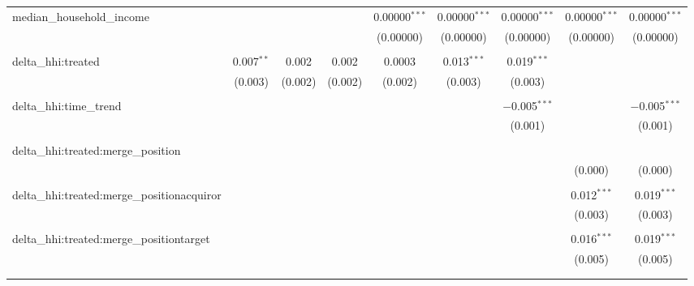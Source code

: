 \begin{table}[H]
{\begin{tabular}{@{\extracolsep{5pt}}lcccccccc}
  median\_household\_income &  &  &  & 0.00000$^{***}$ & 0.00000$^{***}$ & 0.00000$^{***}$ & 0.00000$^{***}$ & 0.00000$^{***}$ \\  

   &  &  &  & (0.00000) & (0.00000) & (0.00000) & (0.00000) & (0.00000) \\  

   & & & & & & & & \\  

  delta\_hhi:treated & 0.007$^{**}$ & 0.002 & 0.002 & 0.0003 & 0.013$^{***}$ & 0.019$^{***}$ &  &  \\  

   & (0.003) & (0.002) & (0.002) & (0.002) & (0.003) & (0.003) &  &  \\  

   & & & & & & & & \\  

  delta\_hhi:time\_trend &  &  &  &  &  & $-$0.005$^{***}$ &  & $-$0.005$^{***}$ \\  

   &  &  &  &  &  & (0.001) &  & (0.001) \\  

   & & & & & & & & \\  

  delta\_hhi:treated:merge\_position &  &  &  &  &  &  &  &  \\  

   &  &  &  &  &  &  & (0.000) & (0.000) \\  

   & & & & & & & & \\  

  delta\_hhi:treated:merge\_positionacquiror &  &  &  &  &  &  & 0.012$^{***}$ & 0.019$^{***}$ \\  

   &  &  &  &  &  &  & (0.003) & (0.003) \\  

   & & & & & & & & \\  

  delta\_hhi:treated:merge\_positiontarget &  &  &  &  &  &  & 0.016$^{***}$ & 0.019$^{***}$ \\  

   &  &  &  &  &  &  & (0.005) & (0.005) \\  

   & & & & & & & & \\  

 \hline \\[-1.8ex]  


\end{tabular}}
\end{table}
